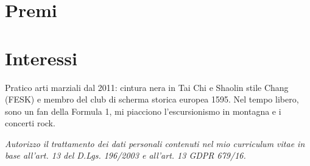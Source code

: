 \documentclass[a4paper,italian]{twentysecondcv} %
\begin{document}

\section{Premi}

\begin{twentyshort} %
\end{twentyshort}


\section{Interessi}

Pratico arti marziali dal 2011: cintura nera in Tai Chi e Shaolin stile Chang (FESK) e membro del club di scherma storica europea 1595. Nel tempo libero, sono un fan della Formula 1, mi piacciono l'escursionismo in montagna e i concerti rock.






\vspace*{\fill}
\begin{center}
{\footnotesize \itshape Autorizzo il trattamento dei dati personali contenuti nel mio curriculum vitae in base all'art. 13 del D.Lgs. 196/2003 e all'art. 13 GDPR 679/16.}
\end{center}
\end{document}
